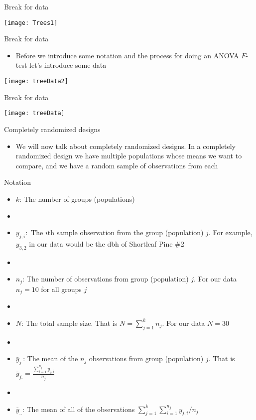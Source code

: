 \documentclass[xcolor=dvipsnames]{beamer}
\begin{document}
\begin{frame}{Break for data}
	\begin{center}
		\texttt{[image: Trees1]}
	\end{center}
\end{frame}

\begin{frame}{Break for data}
	\begin{itemize}
		\item Before we introduce some notation and the process for doing an ANOVA $F$-test let's introduce some data \pause
	\end{itemize}
\begin{center}
	\texttt{[image: treeData2]}
\end{center}
\end{frame}

\begin{frame}{Break for data}
	\begin{center}
		\texttt{[image: treeData]}
	\end{center}
\end{frame}

\begin{frame}{Completely randomized designs}
	\begin{itemize}
		\item We will now talk about completely randomized designs. In a completely randomized design we have multiple populations whose means we want to compare, and we have a random sample of observations from each
	\end{itemize}
\end{frame}

\begin{frame}{Notation}
	\begin{itemize}
		\item $k$: The number of groups (populations) \pause
		\item[]
		\item $y_{j,i}:$ The $i$th sample observation from the group (population) $j$. For example, $y_{3,2}$ in our data would be the dbh of Shortleaf Pine \#2 \pause
		\item[]
		\item $n_j$: The number of observations from group (population) $j$. For our data $n_j=10$ for all groups $j$ \pause
		\item[]
		\item $N$: The total sample size. That is $N = \sum_{j=1}^{k} n_j$. For our data $N = 30$ \pause
		\item[]
		\item $\bar{y}_{j.}$: The mean of the $n_j$ observations from group (population) $j$. That is $\bar{y}_{j.} = \frac{\sum_{i = 1}^{n_j} y_{j,i}}  {n_j}$ \pause
		\item[]
		\item $\bar{y}_{..}$: The mean of all of the observations $\sum_{j=1}^k\sum_{i = 1}^{n_j} y_{j,i} / n_j$
	\end{itemize}
\end{frame}
\end{document}
